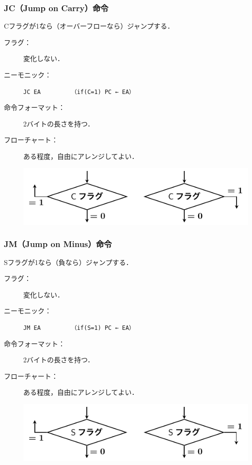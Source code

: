 \documentclass{beamer}                 %
\begin{document}
\begin{frame}
  \frametitle{JC（Jump on Carry）命令}
  Cフラグが1なら（オーバーフローなら）ジャンプする．
  \vfill
  \begin{description}
  \item[フラグ：] 変化しない．
    \vfill

  \item[ニーモニック：]\texttt{JC EA}~~~~~~~~~\texttt{（if(C=1) PC ← EA）}
    \vfill

  \item[命令フォーマット：] 2バイトの長さを持つ．\\
    \vfill

  \item[フローチャート：] ある程度，自由にアレンジしてよい．\\
    \centerline{\includegraphics[scale=0.7]{../Tikz/jc.pdf}}
  \end{description}
  \vfill
\end{frame}

\begin{frame}
  \frametitle{JM（Jump on Minus）命令}
  Sフラグが1なら（負なら）ジャンプする．
  \vfill
  \begin{description}
  \item[フラグ：] 変化しない．
    \vfill

  \item[ニーモニック：]\texttt{JM EA}~~~~~~~~~\texttt{（if(S=1) PC ← EA）}
    \vfill

  \item[命令フォーマット：] 2バイトの長さを持つ．\\
    \vfill

  \item[フローチャート：] ある程度，自由にアレンジしてよい．\\
    \centerline{\includegraphics[scale=0.7]{../Tikz/jm.pdf}}
  \end{description}
  \vfill
\end{frame}
\end{document}
